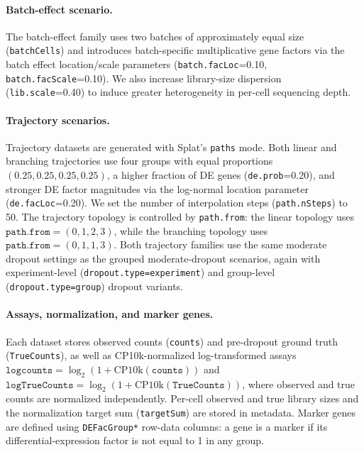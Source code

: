 \paragraph{Batch-effect scenario.}
The batch-effect family uses two batches of approximately equal size
(\texttt{batchCells}) and introduces batch-specific multiplicative gene factors
via the batch effect location/scale parameters
(\texttt{batch.facLoc}=0.10, \texttt{batch.facScale}=0.10). We also increase
library-size dispersion (\texttt{lib.scale}=0.40) to induce greater
heterogeneity in per-cell sequencing depth.

\paragraph{Trajectory scenarios.}
Trajectory datasets are generated with Splat's \texttt{paths} mode. Both linear
and branching trajectories use four groups with equal proportions
$(0.25,0.25,0.25,0.25)$, a higher fraction of DE genes (\texttt{de.prob}=0.20),
and stronger DE factor magnitudes via the log-normal location parameter
(\texttt{de.facLoc}=0.20). We set the number of interpolation steps
(\texttt{path.nSteps}) to 50. The trajectory topology is controlled by
\texttt{path.from}: the linear topology uses $\texttt{path.from}=(0,1,2,3)$,
while the branching topology uses $\texttt{path.from}=(0,1,1,3)$. Both
trajectory families use the same moderate dropout settings as the grouped
moderate-dropout scenarios, again with experiment-level
(\texttt{dropout.type=experiment}) and group-level (\texttt{dropout.type=group})
dropout variants.

\paragraph{Assays, normalization, and marker genes.}
Each dataset stores observed counts (\texttt{counts}) and pre-dropout ground
truth (\texttt{TrueCounts}), as well as CP10k-normalized log-transformed assays
$\texttt{logcounts}=\log_2(1+\mathrm{CP10k}(\texttt{counts}))$ and
$\texttt{logTrueCounts}=\log_2(1+\mathrm{CP10k}(\texttt{TrueCounts}))$, where
observed and true counts are normalized independently. Per-cell observed and
true library sizes and the normalization target sum (\texttt{targetSum}) are
stored in metadata. Marker genes are defined using \texttt{DEFacGroup*}
row-data columns: a gene is a marker if its differential-expression factor is
not equal to 1 in any group.

